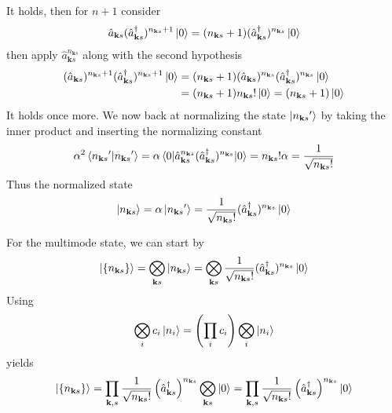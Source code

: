 \documentclass[../../../main.tex]{subfiles}
\begin{document}
It holds, then for $n+1$ consider
\begin{equation*}
  \hat{a}_{\mathbf{k }s} (\hat{a}^\dagger_{\mathbf{k }s} )^{{n_{\mathbf{k }s}}+1} \ket{0}
  = ({n_{\mathbf{k }s}}+1) (\hat{a}^\dagger_{\mathbf{k }s} )^{{n_{\mathbf{k }s}}}\ket{0}
\end{equation*}
then apply $\hat{a}_{\mathbf{k }s} ^{n_{\mathbf{k }s}}$ along with the second hypothesis
\begin{align*}
  (\hat{a}_{\mathbf{k }s})^{{n_{\mathbf{k }s}}+1} (\hat{a}^\dagger_{\mathbf{k }s} )^{{n_{\mathbf{k }s}}+1} \ket{0}
   & =  ({n_{\mathbf{k }s}}+1) (\hat{a}_{\mathbf{k }s} )^{n_{\mathbf{k }s}}(\hat{a}^\dagger_{\mathbf{k }s} )^{{n_{\mathbf{k }s}}}\ket{0} \\
   & = ({n_{\mathbf{k }s}}+1){n_{\mathbf{k }s}}! \ket{0}=({n_{\mathbf{k }s}}+1)\ket{0}
\end{align*}
It holds once more.
We now back at normalizing the state $\ket{{n_{\mathbf{k }s}}'}$ by taking the inner product and inserting the normalizing constant
\begin{equation*}
  \alpha^2\braket{{n_{\mathbf{k }s}}' | {n_{\mathbf{k }s}}'}=\alpha \braket{0 | \hat{a}_{\mathbf{k }s} ^{n_{\mathbf{k }s}} (\hat{a}^\dagger_{\mathbf{k }s} )^{n_{\mathbf{k }s}}|0}={n_{\mathbf{k }s}}!\\
  \alpha=\frac{1 }{\sqrt{{n_{\mathbf{k }s}}!}}
\end{equation*}
Thus the normalized state
\begin{equation*}
  \ket{{n_{\mathbf{k }s}}}=\alpha \ket{{n_{\mathbf{k }s}}'}= \frac{1 }{\sqrt{{n_{\mathbf{k }s}}! }}(\hat{a}^\dagger_{\mathbf{k }s}   )^{n_{\mathbf{k }s}} \ket{0}
\end{equation*}

For the multimode state, we can start by
\begin{equation*}
  \ket{\left\{ n_{\mathbf{k }s} \right\} } = \bigotimes_{\mathbf{k }s}\ket{n_{\mathbf{k }s}}=\bigotimes_{\mathbf{k }s}\frac{1 }{\sqrt{{n_{\mathbf{k }s}}! }}(\hat{a}^\dagger_{\mathbf{k }s}   )^{n_{\mathbf{k }s}} \ket{0}
\end{equation*}
Using
\begin{equation*}
  \bigotimes_i c_i \ket{n_i}= \left( \prod_i c_i  \right) \bigotimes_i \ket{n_i}
\end{equation*}
yields
\begin{equation*}
  \ket{\left\{ n_{\mathbf{k }s}  \right\} }
  =\prod_{\mathbf{k },s} \frac{1 }{\sqrt{n_{\mathbf{k }s}!}}\left( \hat{a }^\dagger_{\mathbf{k }s} \right) ^{n_{\mathbf{k }s}} \bigotimes_{\mathbf{k }s}\ket{0}
  =\prod_{\mathbf{k },s} \frac{1 }{\sqrt{n_{\mathbf{k }s}!}}\left( \hat{a }^\dagger_{\mathbf{k }s} \right) ^{n_{\mathbf{k }s}} \ket{0}
\end{equation*}
\end{document}
